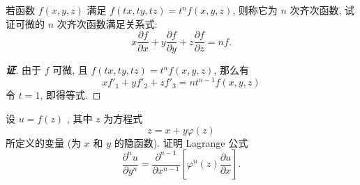 \begin{example}
    若函数 $f(x,y,z)$ 满足 $f(tx,ty,tz)=t^nf(x,y,z)$, 则称它为 $n$ 次齐次函数, 试证可微的 $n$ 次齐次函数满足关系式:
    $$x\frac{\partial f}{\partial x}+y\frac{\partial f}{\partial y}+z\frac{\partial f}{\partial z}=nf.$$
\end{example}
\begin{proof}[{\songti \textbf{证}}]
    由于 $f$ 可微, 且 $f(tx,ty,tz)=t^nf(x,y,z)$, 那么有 $$xf'_1+yf'_2+zf'_3=nt^{n-1}f(x,y,z)$$
    令 $t=1$, 即得等式.
\end{proof}
\begin{example}
    设 $u=f(z)$ , 其中 $z$ 为方程式$$z=x+y\varphi(z)$$所定义的变量 (为 $x$ 和 $y$ 的隐函数).
    证明 Lagrange 公式 $$\frac{\partial^nu}{\partial y^n}=\frac{\partial^{n-1}}{\partial x^{n-1}}\left[\varphi^n(z)\frac{\partial u}{\partial x}\right].$$
\end{example}
